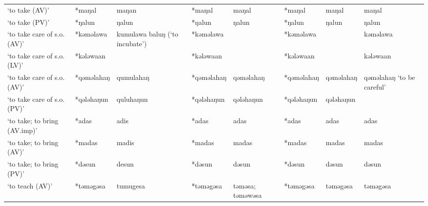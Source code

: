 \begin{landscape}
\begin{longtable}[c]{@{}p{3cm}<{\raggedright}p{2.75cm}<{\raggedright}p{2.75cm}<{\raggedright}p{2.75cm}<{\raggedright}p{2.75cm}<{\raggedright}p{2.75cm}<{\raggedright}p{2.75cm}<{\raggedright}p{2.75cm}<{\raggedright}@{}}
`to take (AV)'                                       & *maŋal             & maŋan                          & *maŋal             & maŋal                      & *maŋal           & maŋal                    & maŋal                             \\
`to take (PV)'                                       & *ŋalun             & ŋalun                          & *ŋalun             & ŋalun                      & *ŋalun           & ŋalun                    & ŋalun                             \\
`to take care of s.o. (AV)'                          & *kəməlawa          & kumulawa baluŋ (`to incubate') & *kəməlawa          &                            & *kəməlawa        &                          & kəməlawa                          \\
`to take care of s.o. (LV)'                          & *kələwaan          &                                & *kələwaan          &                            & *kələwaan        &                          & kələwaan                          \\
`to take care of s.o. (AV)'                          & *qəməlahaŋ         & qumulahaŋ                      & *qəməlahaŋ         & qəməlahaŋ                  & *qəməlahaŋ       & qəməlahaŋ                & qəməlahaŋ `to be careful'         \\
`to take care of s.o. (PV)'                          & *qələhaŋun         & quluhaŋun                      & *qələhaŋun         & qələhaŋun                  & *qələhaŋun       & qələhaŋun                &                                   \\
`to take; to bring (AV.imp)'                         & *adas              & adis                           & *adas              & adas                       & *adas            & adas                     & adas                              \\
`to take; to bring (AV)'                             & *madas             & madis                          & *madas             & madas                      & *madas           & madas                    & madas                             \\
`to take; to bring (PV)'                             & *dəsun             & desun                          & *dəsun             & dəsun                      & *dəsun           & dəsun                    & dəsun                             \\
`to teach (AV)'                                      & *təməgəsa          & tumugesa                       & *təməgəsa          & təməsa; təməwəsa           & *təməgəsa        & təməgəsa                 & təməgəsa                          \\

\end{longtable}
\end{landscape}
